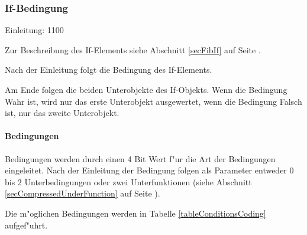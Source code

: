 

\subsubsection{If-Bedingung}

Einleitung: 1100

\bigskip\noindent
Zur Beschreibung des If-Elements siehe Abschnitt \ref{secFibIf} auf Seite \pageref{secFibIf} .

Nach der Einleitung folgt die Bedingung des If-Elements.

Am Ende folgen die beiden Unterobjekte des If-Objekts. Wenn die Bedingung Wahr ist, wird nur das erste Unterobjekt ausgewertet, wenn die Bedingung Falsch ist, nur das zweite Unterobjekt.

\paragraph{Bedingungen}

Bedingungen werden durch einen 4 Bit Wert f"ur die Art der Bedingungen eingeleitet. Nach der Einleitung der Bedingung folgen als Parameter entweder 0 bis 2 Unterbedingungen oder zwei Unterfunktionen (siehe Abschnitt \ref{secCompressedUnderFunction} auf Seite \pageref{secCompressedUnderFunction}).

Die m"oglichen Bedingungen werden in Tabelle \ref{tableConditionsCoding} aufgef"uhrt.

